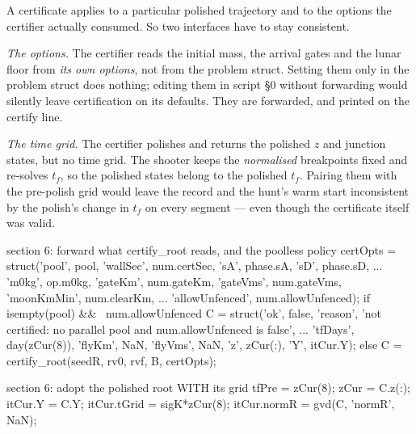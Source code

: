 \documentclass[11pt]{article}
\newcommand{\tf}{t_f}\newcommand{\R}{\mathbb{R}}
\begin{document}
\begin{intu}
A certificate applies to a particular polished trajectory and to the options
the certifier actually consumed. So two interfaces have to stay consistent.

\emph{The options.} The certifier reads the initial mass, the arrival gates
and the lunar floor from \emph{its own options}, not from the problem
struct. Setting them only in the problem struct does nothing; editing them
in script \S0 without forwarding would silently leave certification on its
defaults. They are forwarded, and printed on the certify line.

\emph{The time grid.} The certifier polishes and returns the polished $z$
and junction states, but no time grid. The shooter keeps the
\emph{normalised} breakpoints fixed and re-solves $\tf$, so the polished
states belong to the polished $\tf$. Pairing them with the pre-polish grid
would leave the record and the hunt's warm start inconsistent by the
polish's change in $\tf$ on every segment --- even though the certificate
itself was valid.
\end{intu}

\begin{snippet}{section 6: forward what certify\_root reads, and the poolless policy}
certOpts = struct('pool', pool, 'wallSec', num.certSec, 'sA', phase.sA, 'sD', phase.sD, ...
                  'm0kg', op.m0kg, 'gateKm', num.gateKm, 'gateVms', num.gateVms, 'moonKmMin', num.clearKm, ...
                  'allowUnfenced', num.allowUnfenced);
if isempty(pool) && ~num.allowUnfenced
    C = struct('ok', false, 'reason', 'not certified: no parallel pool and num.allowUnfenced is false', ...
               'tfDays', day(zCur(8)), 'flyKm', NaN, 'flyVms', NaN, 'z', zCur(:), 'Y', itCur.Y);
else
    C = certify_root(seedR, rv0, rvf, B, certOpts);
\end{snippet}
\begin{snippet}{section 6: adopt the polished root WITH its grid}
tfPre = zCur(8);
zCur = C.z(:);
itCur.Y = C.Y;  itCur.tGrid = sigK*zCur(8);  itCur.normR = gvd(C, 'normR', NaN);
\end{snippet}
\end{document}
